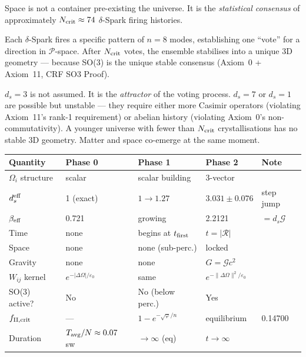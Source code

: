 \documentclass[12pt, a4paper]{article}
\begin{document}
\begin{derivedbox}[title={Space is the Statistical Consensus of $\approx N_{\rm crit}$ $\delta$-Sparks}]
Space is not a container pre-existing the universe. It is the \emph{statistical consensus}
of approximately $N_{\rm crit}\approx 74$ $\delta$-Spark firing histories.

Each $\delta$-Spark fires a specific pattern of $n=8$ modes, establishing one ``vote''
for a direction in $\mathcal{P}$-space. After $N_{\rm crit}$ votes, the ensemble
stabilises into a unique 3D geometry --- because SO(3) is the unique stable consensus
(Axiom~0 + Axiom~11, CRF SO3 Proof).

$d_s=3$ is not assumed. It is the \emph{attractor} of the voting process.
$d_s=7$ or $d_s=1$ are possible but unstable --- they require either more Casimir operators
(violating Axiom~11's rank-1 requirement) or abelian history (violating Axiom~0's
non-commutativity). A younger universe with fewer than $N_{\rm crit}$ crystallisations
has no stable 3D geometry. Matter and space co-emerge at the same moment.
\end{derivedbox}

\begin{center}
\renewcommand{\arraystretch}{1.3}
\begin{tabular}{p{2.5cm} p{1.8cm} p{1.8cm} p{1.8cm} p{4cm}}
\toprule
\textbf{Quantity} & \textbf{Phase 0} & \textbf{Phase 1} & \textbf{Phase 2} & \textbf{Note} \\
\midrule
$\Omega_i$ structure & scalar & scalar building & 3-vector & \\
$d_s^{\rm eff}$ & 1 (exact) & $1\to 1.27$ & $3.031\pm 0.076$ & step jump \\
$\beta_{\rm eff}$ & 0.721 & growing & 2.2121 & $=d_s\mathcal{G}$ \\
Time & none & begins at $t_{\rm first}$ & $t=|\mathcal{R}|$ & \\
Space & none & none (sub-perc.) & locked & \\
Gravity & none & none & $G=\mathcal{G}c^2$ & \\
$W_{ij}$ kernel & $e^{-|\Delta\Omega|/\varepsilon_0}$ & same & $e^{-\|\Delta\Omega\|^2/\varepsilon_0}$ & \\
SO(3) active? & No & No (below perc.) & Yes & \\
$f_{\rm II,crit}$ & --- & $1-e^{-\sqrt{\varphi}/n}$ & equilibrium & 0.14700 \\
Duration & $T_{\rm avg}/N\approx 0.07$ sw & $\to\infty$ (eq) & $t\to\infty$ & \\
\bottomrule
\end{tabular}
\end{center}
\end{document}
